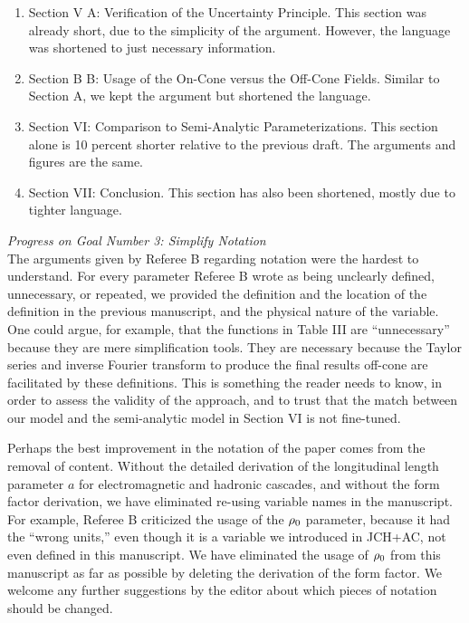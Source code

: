\documentclass[12pt]{article}
\begin{document}
\begin{enumerate}
\item Section V A: Verification of the Uncertainty Principle.  This section was already short, due to the simplicity of the argument.  However, the language was shortened to just necessary information.
\item Section B B: Usage of the On-Cone versus the Off-Cone Fields.  Similar to Section A, we kept the argument but shortened the language.
\item Section VI: Comparison to Semi-Analytic Parameterizations.  This section alone is 10 percent shorter relative to the previous draft.  The arguments and figures are the same.
\item Section VII: Conclusion.  This section has also been shortened, mostly due to tighter language.
\end{enumerate}

\textit{Progress on Goal Number 3: Simplify Notation} \\

The arguments given by Referee B regarding notation were the hardest to understand.  For every parameter Referee B wrote as being unclearly defined, unnecessary, or repeated, we provided the definition and the location of the definition in the previous manuscript, and the physical nature of the variable.  One could argue, for example, that the functions in Table III are ``unnecessary'' because they are mere simplification tools.  They are necessary because the Taylor series and inverse Fourier transform to produce the final results off-cone are facilitated by these definitions.  This is something the reader needs to know, in order to assess the validity of the approach, and to trust that the match between our model and the semi-analytic model in Section VI is not fine-tuned.

Perhaps the best improvement in the notation of the paper comes from the removal of content.  Without the detailed derivation of the longitudinal length parameter $a$ for electromagnetic and hadronic cascades, and without the form factor derivation, we have eliminated re-using variable names in the manuscript.  For example, Referee B criticized the usage of the $\rho_{\rm 0}$ parameter, because it had the ``wrong units,'' even though it is a variable we introduced in JCH+AC, not even defined in this manuscript.  We have eliminated the usage of $\rho_{\rm 0}$ from this manuscript as far as possible by deleting the derivation of the form factor.  We welcome any further suggestions by the editor about which pieces of notation should be changed. \\
\end{document}
